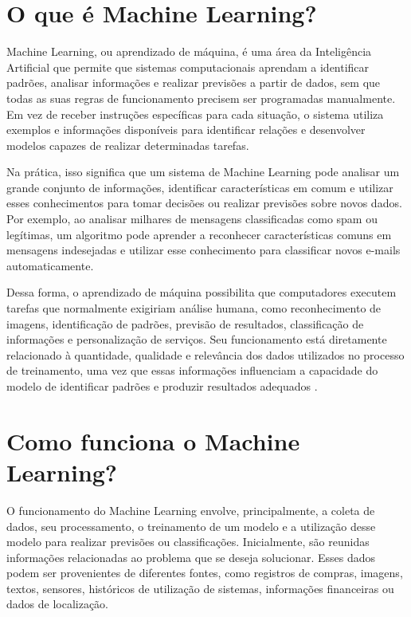 
\chapter{O que é Machine Learning?}

Machine Learning, ou aprendizado de máquina, é uma área da Inteligência Artificial que permite que sistemas computacionais aprendam a identificar padrões, analisar informações e realizar previsões a partir de dados, sem que todas as suas regras de funcionamento precisem ser programadas manualmente. Em vez de receber instruções específicas para cada situação, o sistema utiliza exemplos e informações disponíveis para identificar relações e desenvolver modelos capazes de realizar determinadas tarefas.

Na prática, isso significa que um sistema de Machine Learning pode analisar um grande conjunto de informações, identificar características em comum e utilizar esses conhecimentos para tomar decisões ou realizar previsões sobre novos dados. Por exemplo, ao analisar milhares de mensagens classificadas como spam ou legítimas, um algoritmo pode aprender a reconhecer características comuns em mensagens indesejadas e utilizar esse conhecimento para classificar novos e-mails automaticamente.

Dessa forma, o aprendizado de máquina possibilita que computadores executem tarefas que normalmente exigiriam análise humana, como reconhecimento de imagens, identificação de padrões, previsão de resultados, classificação de informações e personalização de serviços. Seu funcionamento está diretamente relacionado à quantidade, qualidade e relevância dos dados utilizados no processo de treinamento, uma vez que essas informações influenciam a capacidade do modelo de identificar padrões e produzir resultados adequados \cite{googlecloudML, ibmML}.

\chapter{Como funciona o Machine Learning?}

O funcionamento do Machine Learning envolve, principalmente, a coleta de dados, seu processamento, o treinamento de um modelo e a utilização desse modelo para realizar previsões ou classificações. Inicialmente, são reunidas informações relacionadas ao problema que se deseja solucionar. Esses dados podem ser provenientes de diferentes fontes, como registros de compras, imagens, textos, sensores, históricos de utilização de sistemas, informações financeiras ou dados de localização.


